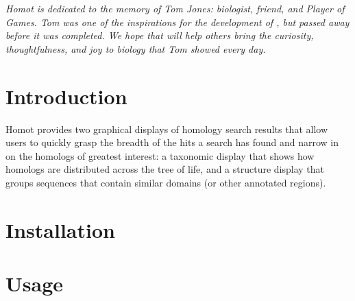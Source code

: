 \documentclass[notoc,justified,openany]{tufte-book}    %
\newcommand{\homot }{{Homot}\xspace}  %
\newcommand{\Homot}{{Homot}\xspace}
\begin{document}
\setcounter{tocdepth}{2}             %

\maketitle




\pagebreak
\hspace{0pt}
\vfill
\emph{\Homot is dedicated to the memory of Tom Jones: biologist, friend, and Player of Games. Tom was one of the inspirations for the development of \hmmot, but passed away before it was completed.  We hope that \hmmot will help others bring the curiosity, thoughtfulness, and joy to biology that Tom showed every day.}
\vfill
\hspace{0pt}

\chapter{Introduction}
\homot provides two graphical displays of homology search results that allow users to quickly grasp the breadth of the hits a search has found and narrow in on the homologs of greatest interest: a taxonomic display that shows how homologs are distributed across the tree of life, and a structure display that groups sequences that contain similar domains (or other annotated regions).  


\chapter{Installation}



\chapter{Usage}
\end{document}
